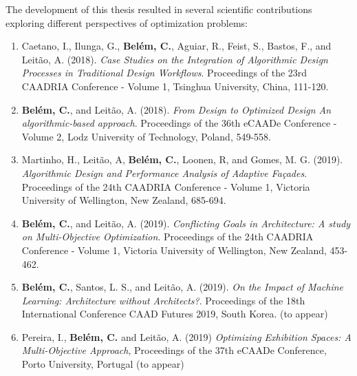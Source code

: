 The development of this thesis resulted in several scientific contributions exploring different perspectives of optimization problems:

\begin{enumerate}
\item Caetano, I., Ilunga, G., \textbf{Belém, C.}, Aguiar, R., Feist, S., Bastos, F., and Leitão, A. (2018). \textit{Case Studies on the Integration of Algorithmic Design Processes in Traditional Design Workflows}. Proceedings of the 23rd CAADRIA Conference - Volume 1, Tsinghua University, China, 111-120.

\item \textbf{Belém, C.}, and Leitão, A. (2018). \textit{From Design to Optimized Design An algorithmic-based approach}. Proceedings of the 36th eCAADe Conference - Volume 2, Lodz University of Technology, Poland, 549-558.

\item Martinho, H., Leitão, A, \textbf{Belém, C.}, Loonen, R, and Gomes, M. G. (2019). \textit{Algorithmic Design and Performance Analysis of Adaptive Façades}. Proceedings of the 24th CAADRIA Conference - Volume 1, Victoria University of Wellington, New Zealand, 685-694.

\item \textbf{Belém, C.}, and Leitão, A. (2019). \textit{Conflicting Goals in Architecture: A study on Multi-Objective Optimization}. Proceedings of the 24th CAADRIA Conference - Volume 1, Victoria University of Wellington, New Zealand, 453-462.

\item \textbf{Belém, C.}, Santos, L. S., and Leitão, A. (2019). \textit{On the Impact of Machine Learning: Architecture without Architects?}. Proceedings of the 18th International Conference CAAD Futures 2019, South Korea. (to appear)

\item Pereira, I., \textbf{Belém, C.} and Leitão, A. (2019) \textit{Optimizing Exhibition Spaces: A Multi-Objective Approach}, Proceedings of the 37th eCAADe Conference, Porto University, Portugal (to appear)

\end{enumerate}



